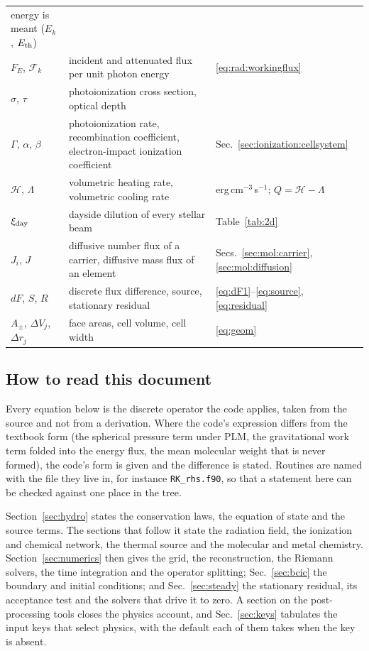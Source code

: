\begin{center}
\begin{tabular}{@{}>{\raggedright\arraybackslash}p{}>{\raggedright\arraybackslash}p{}>{\raggedright\arraybackslash}p{}@{}}
  energy is meant ($E_k$, $E_{\rm th}$) \\
$F_E$, $\mathcal{F}_k$ & incident and attenuated flux per unit photon
  energy & \eqref{eq:rad:workingflux} \\
$\sigma$, $\tau$ & photoionization cross section, optical depth & \\
$\Gamma$, $\alpha$, $\beta$ & photoionization rate, recombination
  coefficient, electron-impact ionization coefficient &
  Sec.~\ref{sec:ionization:cellsystem} \\
$\mathcal{H}$, $\Lambda$ & volumetric heating rate, volumetric cooling
  rate & erg\,cm$^{-3}$\,s$^{-1}$; $Q = \mathcal{H}-\Lambda$ \\
$\xi_{\rm day}$ & dayside dilution of every stellar beam &
  Table~\ref{tab:2d} \\
$J_i$, $J$ & diffusive number flux of a carrier, diffusive mass flux of an
  element & Secs.~\ref{sec:mol:carrier}, \ref{sec:mol:diffusion} \\
$dF$, $S$, $R$ & discrete flux difference, source, stationary residual &
  \eqref{eq:dF1}--\eqref{eq:source}, \eqref{eq:residual} \\
$A_\pm$, $\Delta V_j$, $\Delta r_j$ & face areas, cell volume, cell width &
  \eqref{eq:geom} \\
\bottomrule
\end{tabular}
\end{center}

\subsection{How to read this document}
\label{sec:intro:layout}

Every equation below is the discrete operator the code applies, taken from
the source and not from a derivation.  Where the code's expression differs
from the textbook form (the spherical pressure term under PLM, the
gravitational work term folded into the energy flux, the mean molecular
weight that is never formed), the code's form is given and the difference is
stated.  Routines are named with the file they live in, for instance
\texttt{RK\_rhs.f90}, so that a statement here can be checked against one
place in the tree.

Section~\ref{sec:hydro} states the conservation laws, the equation of state
and the source terms.  The sections that follow it state the radiation field,
the ionization and chemical network, the thermal source and the molecular and
metal chemistry.  Section~\ref{sec:numerics} then gives the grid, the
reconstruction, the Riemann solvers, the time integration and the operator
splitting; Sec.~\ref{sec:bcic} the boundary and initial conditions; and
Sec.~\ref{sec:steady} the stationary residual, its acceptance test and the
solvers that drive it to zero.  A section on the post-processing tools closes
the physics account, and Sec.~\ref{sec:keys} tabulates the input keys that
select physics, with the default each of them takes when the key is absent.
